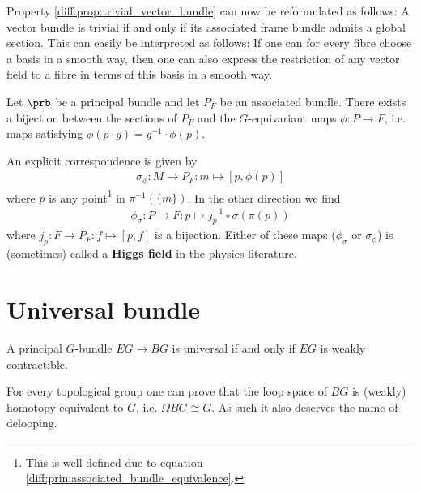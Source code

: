     \begin{property}
        Property \ref{diff:prop:trivial_vector_bundle} can now be reformulated as follows: A vector bundle is trivial if and only if its associated frame bundle admits a global section. This can easily be interpreted as follows: If one can for every fibre choose a basis in a smooth way, then one can also express the restriction of any vector field to a fibre in terms of this basis in a smooth way.
    \end{property}

    \begin{property}\label{diff:prin:section_bijection}
        Let $\prb$ be a principal bundle and let $P_F$ be an associated bundle. There exists a bijection between the sections of $P_F$ and the $G$-equivariant maps $\phi:P\rightarrow F$, i.e. maps satisfying $\phi(p\cdot g) = g^{-1}\cdot\phi(p)$.

        An explicit correspondence is given by
        \begin{gather}
            \sigma_\phi:M\rightarrow P_F:m\mapsto [p, \phi(p)]
        \end{gather}
        where $p$ is any point\footnote{This is well defined due to equation \ref{diff:prin:associated_bundle_equivalence}.} in $\pi^{-1}(\{m\})$. In the other direction we find
        \begin{gather}
            \label{diff:prin:section_bijection_phi}
            \phi_\sigma:P\rightarrow F: p\mapsto j_p^{-1}\circ\sigma(\pi(p))
        \end{gather}
        where $j_p:F\rightarrow P_F:f\mapsto[p, f]$ is a bijection. Either of these maps ($\phi_\sigma$ or $\sigma_\phi$) is (sometimes) called a \textbf{Higgs field} in the physics literature.
    \end{property}

\section{Universal bundle}

    \begin{property}
        A principal $G$-bundle $EG\rightarrow BG$ is universal if and only if $EG$ is weakly contractible.
    \end{property}
    \begin{property}[Delooping]\label{diff:delooping}
        For every topological group one can prove that the loop space of $BG$ is (weakly) homotopy equivalent to $G$, i.e. $\Omega BG\cong G$. As such it also deserves the name of delooping.
    \end{property}

